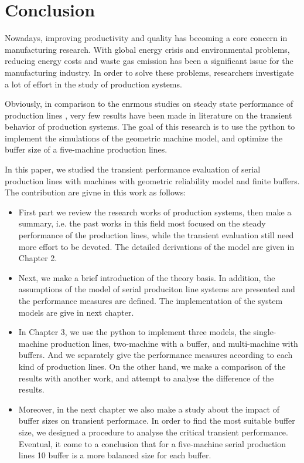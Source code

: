 \chapter{Conclusion}
\label{E_Kapitel}
\noindent Nowadays, improving productivity and quality has becoming a core concern in manufacturing research. With global energy crisis and environmental problems, reducing energy costs and waste gas emission has been a significant issue for the manufacturing industry. In order to solve these problems, researchers investigate a lot of effort in the study of production systems. 

Obviously, in comparison to the enrmous studies on steady state performance of production lines \cite{gershwin1991assembly,liu1990approximate}, very few results have been made in literature on the transient behavior of production systems. The goal of this research is to use the python to implement the simulations of the geometric machine model, and optimize the buffer size of a five-machine production lines.

In this paper, we studied the transient performance evaluation of serial production lines with machines with geometric reliability model and finite buffers. The contribution are givne in this work as follows:

\begin{itemize}
    \item First part we review the research works of production systems, then make a summary, i.e. the past works in this field most focused on the steady performance of the production lines, while the transient evaluation still need more effort to be devoted. The detailed derivations of the model are given in Chapter 2.
    \item Next, we make a brief introduction of the theory basis. In addition, the assumptions of the model of serial produciton line systems are presented and the performance measures are defined. The implementation of the system models are give in next chapter.
    \item In Chapter 3, we use the python to implement three models, the single-machine production lines, two-machine with a buffer, and multi-machine with buffers. And we separately give the performance measures according to each kind of production lines. On the other hand, we make a comparison of the results with another work, and attempt to analyse the difference of the results. 
    \item Moreover, in the next chapter we also make a study about the impact of buffer sizes on transient performace. In order to find the most suitable buffer size, we designed a procedure to analyse the critical transient performance. Eventual, it come to a conclusion that for a five-machine serial production lines 10 buffer is a more balanced size for each buffer.  
    
\end{itemize}

